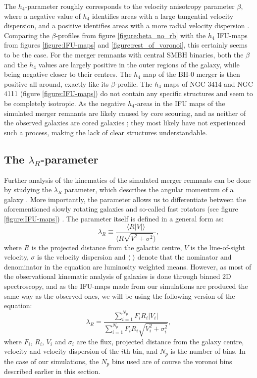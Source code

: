 \documentclass[english, oneside]{HYgradu}
\begin{document}
The $h_4$-parameter roughly corresponds to the velocity anisotropy parameter $\beta$, where a negative value of $h_4$ identifies areas with a large tangential velocity dispersion, and a positive identifies areas with a more radial velocity dispersion \citep{Gerhard1993, Gerhard1998, Thomas2007}. Comparing the $\beta$-profiles from figure \ref{figure:beta_no_rb} with the $h_4$ IFU-maps from figures \ref{figure:IFU-maps} and \ref{figure:rest_of_voronoi}, this certainly seems to be the case. For the merger remnants with central SMBH binaries, both the $\beta$ and the $h_4$ values are largely positive in the outer regions of the galaxy, while being negative closer to their centres. The $h_4$ map of the BH-0 merger is then positive all around, exactly like its $\beta$-profile. The $h_4$ maps of NGC 3414 and NGC 4111 (figure \ref{figure:IFU-maps}) do not contain any specific structures and seem to be completely isotropic. As the negative $h_4$-areas in the IFU maps of the simulated merger remnants are likely caused by core scouring, and as neither of the observed galaxies are cored galaxies \citep{Lauer2007}; they most likely have not experienced such a process, making the lack of clear structures understandable.

\subsection{The $\lambda_R$-parameter}

Further analysis of the kinematics of the simulated merger remnants can be done by studying the $\lambda_R$ parameter, which describes the angular momentum of a galaxy \citep{Emsellem2007}. More importantly, the parameter allows us to differentiate between the aforementioned slowly rotating galaxies and so-called fast rotators (see figure \ref{figure:IFU-maps}) \citep{Emsellem2007}. The parameter itself is defined in a general form as:
\begin{equation}
\lambda_R \equiv \frac{\langle R |V| \rangle}{\langle R \sqrt{V^2 + \sigma^2} \rangle}, \label{eq:general_lambdar}
\end{equation}
where $R$ is the projected distance from the galactic centre, $V$ is the line-of-sight velocity, $\sigma$ is the velocity dispersion and $\langle \; \rangle$ denote that the nominator and denominator in the equation are luminosity weighted means. However, as most of the observational kinematic analysis of galaxies is done through binned 2D spectroscopy, and as the IFU-maps made from our simulations are produced the same way as the observed ones, we will be using the following version of the equation:
\begin{equation}
\lambda_R = \frac{\sum^{N_p}_{i=1} F_i R_i |V_i|}{\sum^{N_p}_{i=1} F_i R_i \sqrt{V_i^2 + \sigma^2_i}}, \label{eq:binned_lambdar}
\end{equation}
where $F_i$, $R_i$, $V_i$ and $\sigma_i$ are the flux, projected distance from the galaxy centre, velocity and velocity dispersion of the $i$th bin, and $N_p$ is the number of bins. In the case of our simulations, the $N_p$ bins used are of course the voronoi bins described earlier in this section. 
\end{document}
